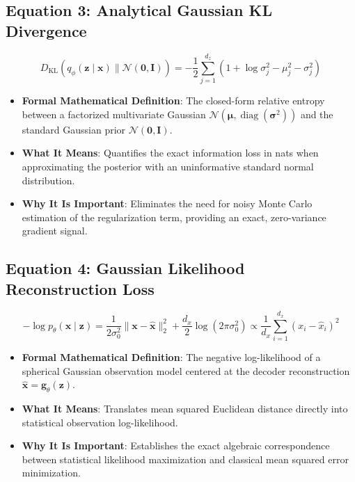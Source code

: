 \documentclass[11pt,a4paper]{article}
\theoremstyle{definition}
\begin{document}
\subsection{\textbf{Equation 3: Analytical Gaussian KL Divergence}}
{\boldmath
\begin{equation}
D_{\text{KL}}(q_\phi(\mathbf{z} \mid \mathbf{x}) \parallel \mathcal{N}(\mathbf{0}, \mathbf{I})) = -\frac{1}{2} \sum_{j=1}^{d_z} \left( 1 + \log \sigma_j^2 - \mu_j^2 - \sigma_j^2 \right)
\end{equation}
}
\begin{itemize}
    \item \textbf{Formal Mathematical Definition}:
    The closed-form relative entropy between a factorized multivariate Gaussian $\mathcal{N}(\boldsymbol{\mu}, \operatorname{diag}(\boldsymbol{\sigma}^2))$ and the standard Gaussian prior $\mathcal{N}(\mathbf{0}, \mathbf{I})$.
    \item \textbf{What It Means}:
    Quantifies the exact information loss in nats when approximating the posterior with an uninformative standard normal distribution.
    \item \textbf{Why It Is Important}:
    Eliminates the need for noisy Monte Carlo estimation of the regularization term, providing an exact, zero-variance gradient signal.
\end{itemize}

\subsection{\textbf{Equation 4: Gaussian Likelihood Reconstruction Loss}}
{\boldmath
\begin{equation}
-\log p_\theta(\mathbf{x} \mid \mathbf{z}) = \frac{1}{2\sigma_0^2} \|\mathbf{x} - \hat{\mathbf{x}}\|_2^2 + \frac{d_x}{2}\log(2\pi \sigma_0^2) \propto \frac{1}{d_x} \sum_{i=1}^{d_x} (x_i - \hat{x}_i)^2
\end{equation}
}
\begin{itemize}
    \item \textbf{Formal Mathematical Definition}:
    The negative log-likelihood of a spherical Gaussian observation model centered at the decoder reconstruction $\hat{\mathbf{x}} = \mathbf{g}_\theta(\mathbf{z})$.
    \item \textbf{What It Means}:
    Translates mean squared Euclidean distance directly into statistical observation log-likelihood.
    \item \textbf{Why It Is Important}:
    Establishes the exact algebraic correspondence between statistical likelihood maximization and classical mean squared error minimization.
\end{itemize}
\end{document}
